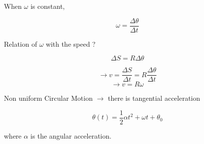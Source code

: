 \documentclass[]{beamer}
\begin{document}
 \begin{frame}
    When $\omega$ is constant,


 
    
    
    \begin{equation}
        \boxed{\omega=\frac{\Delta \theta}{\Delta t}}
    \end{equation}
\pause

    Relation of $\omega$ with the speed ?

\begin{equation*}
    \Delta S=R\Delta\theta 
\end{equation*}

\pause
\begin{equation*}
   \rightarrow  v=\frac{\Delta S}{\Delta t}= R\frac{\Delta\theta}{\Delta t}
\end{equation*}
\pause
\begin{equation*}
    \rightarrow  v= R\omega
 \end{equation*}
    
    \end{frame}

 \begin{frame}
Non uniform Circular Motion \pause $\rightarrow$ there is tangential acceleration

\vspace{5mm}

\pause

\begin{equation}
  \theta(t)= \frac{1}{2}\alpha t^2 +  \omega t +\theta_0
\end{equation}

where $\alpha$ is the angular acceleration.



    \end{frame}

\end{document}

